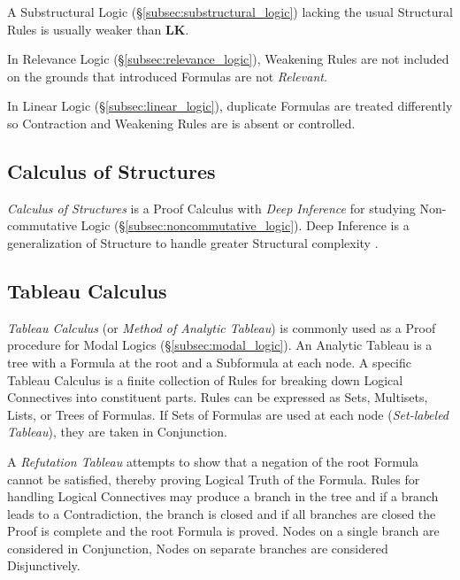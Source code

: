\documentclass{article}
\begin{document}
A Substructural Logic (\S\ref{subsec:substructural_logic}) lacking the
usual Structural Rules is usually weaker than $\mathbf{LK}$.

In Relevance Logic (\S\ref{subsec:relevance_logic}), Weakening Rules
are not included on the grounds that introduced Formulas are not
\emph{Relevant}.

In Linear Logic (\S\ref{subsec:linear_logic}), duplicate Formulas are
treated differently so Contraction and Weakening Rules are is absent
or controlled.

\subsection{Calculus of Structures}

\emph{Calculus of Structures} is a Proof Calculus with \emph{Deep
  Inference} for studying Non-commutative Logic
(\S\ref{subsec:noncommutative_logic}). Deep Inference is a
generalization of Structure to handle greater Structural complexity
\cite{schutte77}.

\subsection{Tableau Calculus}\label{subsec:tableau_calculus}

\emph{Tableau Calculus} (or \emph{Method of Analytic Tableau}) is
commonly used as a Proof procedure for Modal Logics
(\S\ref{subsec:modal_logic}). An Analytic Tableau is a tree with a
Formula at the root and a Subformula at each node. A specific Tableau
Calculus is a finite collection of Rules for breaking down Logical
Connectives into constituent parts. Rules can be expressed as Sets,
Multisets, Lists, or Trees of Formulas. If Sets of Formulas are used
at each node (\emph{Set-labeled Tableau}), they are taken in
Conjunction.

A \emph{Refutation Tableau} attempts to show that a negation of the
root Formula cannot be satisfied, thereby proving Logical Truth of the
Formula. Rules for handling Logical Connectives may produce a branch
in the tree and if a branch leads to a Contradiction, the branch is
closed and if all branches are closed the Proof is complete and the
root Formula is proved. Nodes on a single branch are considered in
Conjunction, Nodes on separate branches are considered Disjunctively.
\end{document}
